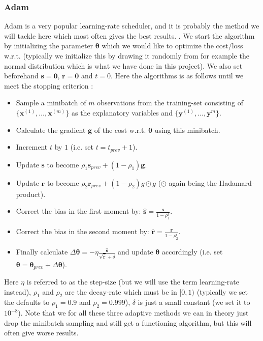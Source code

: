\documentclass{article}
\begin{document}
\subsubsection{Adam}
Adam is a very popular learning-rate scheduler, and it is probably the method we
will tackle here which most often gives the best results.
\cite[s.~8.6.1]{goodfellow2016deep}. We start the algorithm by initializing the
parameter $\bm{\theta}$ which we would like to optimize the cost/loss w.r.t.
(typically we initialize this by drawing it randomly from for example the normal
distribution which is what we have done in this project). We also set beforehand
$\bm{s} = \bm{0}$, $\bm{r} = \bm{0}$ and $t=0$. Here the algorithms is as
follows until we meet the stopping criterion \cite[algortihm~8.7]{goodfellow2016deep}:
\begin{itemize}
      \item Sample a minibatch of $m$ observations from the training-set
            consisting of $\{\bm{x}^{(1)}, \dots, \bm{x}^{(m)}\}$ as the explanatory
            variables and $\{\bm{y}^{(1)}, \dots, \bm{y}^{m}\}$.
      \item Calculate the gradient $\bm{g}$ of the cost w.r.t. $\bm{\theta}$ using
            this minibatch.
      \item Increment $t$ by $1$ (i.e. set $t=t_{prev}+1$).
      \item Update $\bm{s}$ to become $\rho_1 \bm{s}_{prev} + (1 - \rho_1)\bm{g}$.
      \item Update $\bm{r}$ to become $\rho_2 \bm{r}_{prev} + (1 - \rho_2)g \odot
                  g$ ($\odot$ again being the Hadamard-product).
      \item Correct the bias in the first moment by: $\hat{\bm{s}} = \frac{\bm{s}}{1 - \rho_1^t}$.
      \item Correct the bias in the second moment by: $\hat{\bm{r}} = \frac{\bm{r}}{1 - \rho_2^t}$.
      \item Finally calculate $\Delta \bm{\theta} = -\eta
                  \frac{\hat{\bm{s}}}{\sqrt{\hat{\bm{r}}} + \delta}$ and update $\bm{\theta}$
            accordingly (i.e. set $\bm{\theta} = \bm{\theta}_{prev} + \Delta
                  \bm{\theta}$).
\end{itemize}
Here $\eta$ is referred to as the step-size (but we will use the term
learning-rate instead), $\rho_1$ and $\rho_2$ are the decay-rate which must be
in $[0, 1)$ (typically we set the defaults to $\rho_1 = 0.9$ and $\rho_2 =
      0.999$), $\delta$ is just a small constant (we set it to $10^{-8}$). Note that
we for all these three adaptive methods we can in theory just drop the minibatch
sampling and still get a functioning algorithm, but this will often give worse
results.
\end{document}
